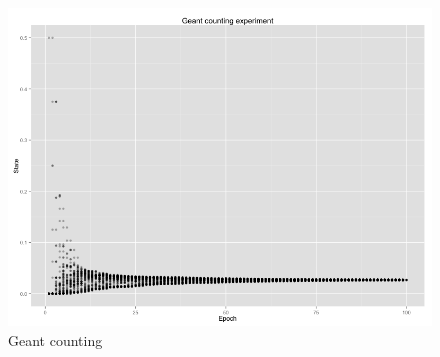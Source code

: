 
\begin{figure}[h!]
    \begin{center}
    \includegraphics[width=\linewidth]{figures/geant_counting_exp.png}
    \end{center}
    \caption{Geant counting}
    \label{fig:geant}
\end{figure}
\label{sec:results}
